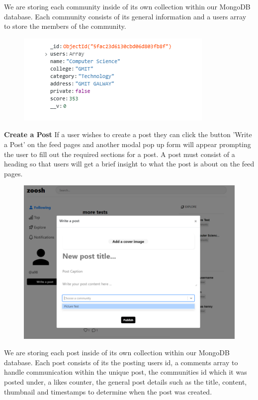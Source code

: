 We are storing each community inside of its own collection within our MongoDB database. Each community consists of its general information and a users array to store the members of the community.

\begin{figure}[H]
  \centering
  \includegraphics[scale=0.85]{img/SocsCollection.PNG}
  \label{fig:Communities Collection - MongoDB.}
\end{figure}

\newpage
\textbf{Create a Post}
\newline
If a user wishes to create a post they can click the button 'Write a Post' on the feed pages and another modal pop up form will appear prompting the user to fill out the required sections for a post. A post must consist of a heading so that users will get a brief insight to what the post is about on the feed pages. 

\begin{figure}[H]
  \centering
  \includegraphics[scale=0.35]{img/createpost.PNG}
  \label{fig:Create Post Modal.}
\end{figure}

We are storing each post inside of its own collection within our MongoDB database. Each post consists of its the posting users id, a comments array to handle communication within the unique post, the communities id which it was posted under, a likes counter, the general post details such as the title, content, thumbnail and timestamps to determine when the post was created. 

